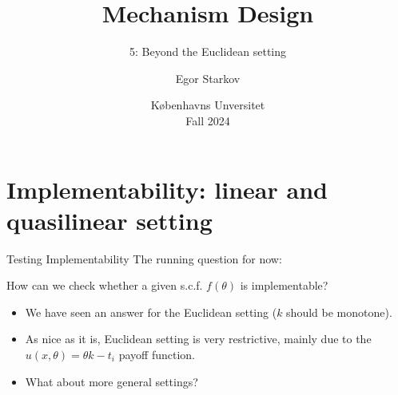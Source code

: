 \documentclass[english,10pt
,aspectratio=169
]{beamer}
\title{Mechanism Design}
\subtitle{5: Beyond the Euclidean setting}
\author{Egor Starkov}
\date{K{\o}benhavns Unversitet \\
	Fall 2024}
\begin{document}
	\frame[plain]{\titlepage}



\section{Implementability: linear and quasilinear setting}

\begin{frame}{Testing Implementability}
	The running question for now:
	\begin{exampleblock}{}
		How can we check whether a given s.c.f. $f(\theta)$ is implementable?
	\end{exampleblock} 
	\begin{itemize}
		\item We have seen an answer for the Euclidean setting ($k$ should be monotone). 
		\item As nice as it is, Euclidean setting is very restrictive, mainly due to the $u(x,\theta)=\theta k - t_i$ payoff function.
		\item What about more general settings?
	\end{itemize}
\end{frame}


%		
\end{document}
